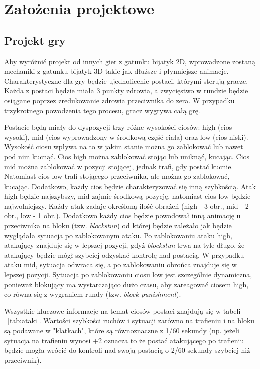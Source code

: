 \chapter{Założenia projektowe}
\section{Projekt gry}

Aby wyróżnić projekt od innych gier z gatunku bijatyk 2D, wprowadzone zostaną mechaniki z gatunku bijatyk 3D takie jak dłuższe i płynniejsze animacje. Charakterystyczne dla gry będzie ujednolicenie postaci, którymi sterują gracze. Każda z postaci będzie miała 3 punkty zdrowia, a zwycięstwo w rundzie będzie osiągane poprzez zredukowanie zdrowia przeciwnika do zera. W przypadku trzykrotnego powodzenia tego procesu, gracz wygrywa całą grę. 

Postacie będą miały do dyspozycji trzy różne wysokości ciosów: high (cios wysoki), mid (cios wyprowadzony w środkową część ciała) oraz low (cios niski). Wysokość ciosu wpływa na to w jakim stanie można go zablokować lub nawet pod nim kucnąć. Cios high można zablokować stojąc lub uniknąć, kucając. Cios mid można zablokować w pozycji stojącej, jednak trafi, gdy postać kucnie. Natomiast cios low trafi stojącego przeciwnika, ale można go zablokować, kucając. Dodatkowo, każdy cios będzie charakteryzować się inną szybkością. Atak high będzie najszybszy, mid zajmie środkową pozycję, natomiast cios low będzie najwolniejszy. Każdy atak zadaje określoną ilość obrażeń (high - 3 obr., mid - 2 obr., low - 1 obr.). Dodatkowo każdy cios będzie powodował inną animację u przeciwnika na bloku (tzw. \emph{blockstun}) od której będzie zależało jak będzie wyglądała sytuacja po zablokowanym ataku. Po zablokowaniu ataku high, atakujący znajduje się w lepszej pozycji, gdyż \emph{blockstun} trwa na tyle długo, że atakujący będzie mógł szybciej odzyskać kontrolę nad postacią. W przypadku ataku mid, sytuacja odwraca się, a po zablokowaniu obrońca znajduje się w lepszej pozycji. Sytuacja po zablokowaniu ciosu low jest szczególnie dynamiczna, ponieważ blokujący ma wystarczająco dużo czasu, aby zareagować ciosem high, co równa się z wygraniem rundy (tzw. \emph{block punishment}).

Wszystkie kluczowe informacje na temat ciosów postaci znajdują się w tabeli ~\ref{tab:ataki}. Wartości szybkości ruchów i sytuacji zarówno na trafieniu i na bloku są podawane w "klatkach", które są równoznaczne z 1/60 sekundy (np. jeżeli sytuacja na trafieniu wynosi +2 oznacza to że postać atakującego po trafieniu będzie mogła wrócić do kontroli nad swoją postacią o 2/60 sekundy szybciej niż przeciwnik).

